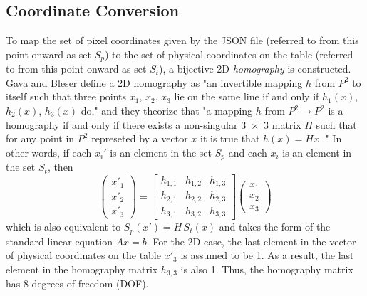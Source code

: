 \documentclass{article}
\begin{document}
          \subsection{Coordinate Conversion}
          To map the set of pixel coordinates given by the JSON file (referred to from this point onward as set $S_p$) to the set of physical coordinates on the table (referred to from this point onward as set $S_t$), a bijective 2D \textit{homography} is constructed. Gava and Bleser define a 2D homography as "an invertible mapping $h$ from $P^2$ to itself such that three points $x_1$, $x_2$, $x_3$ lie on the same line if and only if $h_1(x)$, $h_2(x)$, $h_3(x)$ do," and they theorize that "a mapping $h$ from $P^2\rightarrow P^2$ is a homography if and only if there exists a non-singular \num{3x3} matrix $H$ such that for any point in $P^2$ represeted by a vector $x$ it is true that $h(x)=Hx$ \cite{GavaDfki}." In other words, if each $x_i'$ is an element in the set $S_p$ and each $x_i$ is an element in the set $S_t$, then
          \begin{equation}
               \begin{pmatrix}
                    x'_1\\
                    x'_2\\
                    x'_3
               \end{pmatrix}
               =
               \begin{bmatrix}
                    h_{1,1} & h_{1,2} & h_{1,3} \\
                    h_{2,1} & h_{2,2} & h_{2,3} \\
                    h_{3,1} & h_{3,2} & h_{3,3}
               \end{bmatrix}
               \begin{pmatrix}
                    x_1 \\
                    x_2 \\
                    x_3
               \end{pmatrix}
          \end{equation}
          which is also equivalent to $S_p(x')=H\,S_t(x)$ and takes the form of the standard linear equation $Ax=b$. For the 2D case, the last element in the vector of physical coordinates on the table $x'_3$ is assumed to be 1. As a result, the last element in the homography matrix $h_{3,3}$ is also 1. Thus, the homography matrix has 8 degrees of freedom (DOF).
\end{document}
